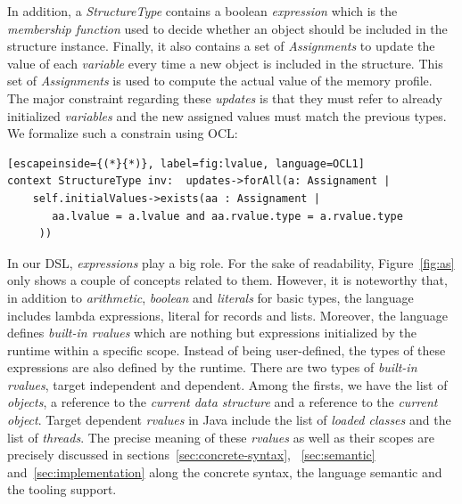 In addition, a \textit{StructureType} contains a boolean \textit{expression} which is the \textit{membership function} used to decide whether an object should be included in the structure instance.
Finally, it also contains a set of \textit{Assignments} to update the value of each \textit{variable} every time a new object is included in the structure.
This set of \textit{Assignments} is used to compute the actual value of the memory profile.
The major constraint regarding these \textit{updates} is that they must refer to already initialized \textit{variables} and the new assigned values must match the previous types.
We formalize such a constrain using OCL:

\begin{lstlisting}[escapeinside={(*}{*)}, label=fig:lvalue, language=OCL1]
context StructureType inv:  updates->forAll(a: Assignament | 
    self.initialValues->exists(aa : Assignament | 
       aa.lvalue = a.lvalue and aa.rvalue.type = a.rvalue.type
     ))
\end{lstlisting}

In our DSL, \textit{expressions} play a big role.
For the sake of readability, Figure~\ref{fig:as} only shows a couple of concepts related to them.
However, it is noteworthy that, in addition to \textit{arithmetic}, \textit{boolean} and \textit{literals} for basic types, the language includes lambda expressions, literal for records and lists.
Moreover, the language defines \textit{built-in rvalues} which are nothing but expressions initialized by the runtime within a specific scope.
Instead of being user-defined, the types of these expressions are also defined by the runtime.
There are two types of \textit{built-in rvalues}, target independent and dependent.
Among the firsts, we have the list of  \textit{objects}, a reference to the \textit{current data structure} and a reference to the \textit{current object}.
Target dependent \textit{rvalues} in Java include the list of \textit{loaded classes} and the list of \textit{threads}.
The precise meaning of these \textit{rvalues} as well as their scopes are precisely discussed in sections~\ref{sec:concrete-syntax}, ~\ref{sec:semantic} and~\ref{sec:implementation} along the concrete syntax, the language semantic and the tooling support.

